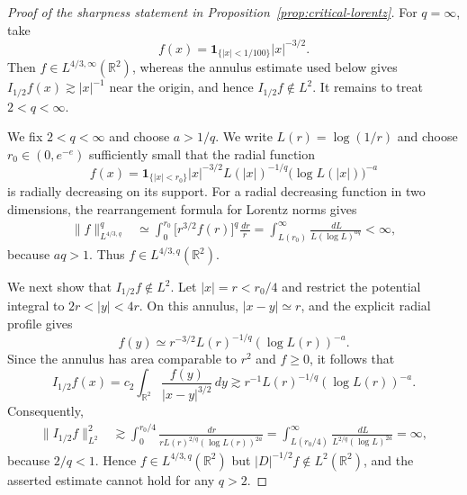 \documentclass[11pt,reqno]{amsproc}
\newcommand{\R}{\mathbb R}
\newcommand{\one}{\mathbf 1}
\newcommand{\dd}{\,d}
\begin{document}
\begin{proof}[Proof of the sharpness statement in
Proposition~\ref{prop:critical-lorentz}]
For $q=\infty$, take
\[
  f(x)=\one_{\{|x|<1/100\}}|x|^{-3/2}.
\]
Then $f\in L^{4/3,\infty}(\R^2)$, whereas the annulus estimate used below
gives $I_{1/2}f(x)\gtrsim |x|^{-1}$ near the origin, and hence
$I_{1/2}f\notin L^2$.  It remains to treat $2<q<\infty$.
	
\begingroup
We fix $2<q<\infty$ and choose $a>1/q$.  We write
$L(r)=\log(1/r)$ and choose $r_0\in(0,e^{-e})$ sufficiently small that the
radial function
\[
 f(x)=\one_{\{|x|<r_0\}}|x|^{-3/2}
       L(|x|)^{-1/q}\bigl(\log L(|x|)\bigr)^{-a}
\]
is radially decreasing on its support.  For a radial decreasing function in
two dimensions, the rearrangement formula for Lorentz norms gives
\begin{align*}
 \|f\|_{L^{4/3,q}}^q
 &\simeq
 \int_0^{r_0}\bigl[r^{3/2}f(r)\bigr]^q\frac{\dd r}{r}=\int_{L(r_0)}^\infty
   \frac{\dd L}{L(\log L)^{aq}}<\infty,
\end{align*}
because $aq>1$.  Thus $f\in L^{4/3,q}(\R^2)$.

We next show that $I_{1/2}f\notin L^2$.  Let $|x|=r<r_0/4$ and restrict the
potential integral to $2r<|y|<4r$.  On this annulus,
$|x-y|\simeq r$, and the explicit radial profile gives
\[
 f(y)\simeq r^{-3/2}L(r)^{-1/q}(\log L(r))^{-a}.
\]
Since the annulus has area comparable to $r^2$ and $f\geq0$, it follows that
\[
 I_{1/2}f(x)
 =c_2\int_{\R^2}\frac{f(y)}{|x-y|^{3/2}}\dd y
 \gtrsim r^{-1}L(r)^{-1/q}(\log L(r))^{-a}.
\]
Consequently,
\begin{align*}
 \|I_{1/2}f\|_{L^2}^2
 &\gtrsim
 \int_0^{r_0/4}
 \frac{\dd r}{rL(r)^{2/q}(\log L(r))^{2a}}=\int_{L(r_0/4)}^\infty
 \frac{\dd L}{L^{2/q}(\log L)^{2a}}
 =\infty,
\end{align*}
because $2/q<1$.  Hence $f\in L^{4/3,q}(\R^2)$ but
$|D|^{-1/2}f\notin L^2(\R^2)$, and the asserted estimate cannot hold for any
$q>2$.
\endgroup
\end{proof}
\end{document}

